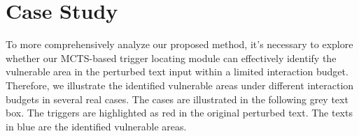 \section{Case Study}
To more comprehensively analyze our proposed method, it's necessary to explore whether our MCTS-based trigger locating module can effectively identify the vulnerable area in the perturbed text input within a limited interaction budget. Therefore, we illustrate the identified vulnerable areas under different interaction budgets in several real cases. The cases are illustrated in the following grey text box. The triggers are highlighted as red in the original perturbed text. The texts in blue are the identified vulnerable areas. 

